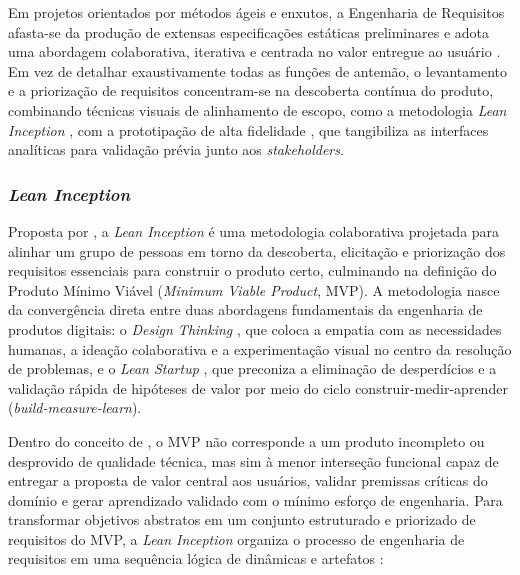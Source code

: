 Em projetos orientados por métodos ágeis e enxutos, a Engenharia de Requisitos afasta-se da produção de extensas especificações estáticas preliminares e adota uma abordagem colaborativa, iterativa e centrada no valor entregue ao usuário \cite{vazquez_engenharia_2016, cohn_user_2004}. Em vez de detalhar exaustivamente todas as funções de antemão, o levantamento e a priorização de requisitos concentram-se na descoberta contínua do produto, combinando técnicas visuais de alinhamento de escopo, como a metodologia \textit{Lean Inception} \cite{caroli_lean_2018}, com a prototipação de alta fidelidade \cite{pressman_engenharia_2021}, que tangibiliza as interfaces analíticas para validação prévia junto aos \textit{stakeholders}.

\subsubsection{\textit{Lean Inception}}
\label{subsubsec:lean-inception}

Proposta por , a \textit{Lean Inception} é uma metodologia colaborativa projetada para alinhar um grupo de pessoas em torno da descoberta, elicitação e priorização dos requisitos essenciais para construir o produto certo, culminando na definição do Produto Mínimo Viável (\textit{Minimum Viable Product}, MVP). A metodologia nasce da convergência direta entre duas abordagens fundamentais da engenharia de produtos digitais: o \textit{Design Thinking} \cite{brown_design_2010}, que coloca a empatia com as necessidades humanas, a ideação colaborativa e a experimentação visual no centro da resolução de problemas, e o \textit{Lean Startup} \cite{ries_lean_2011}, que preconiza a eliminação de desperdícios e a validação rápida de hipóteses de valor por meio do ciclo construir-medir-aprender (\textit{build-measure-learn}).

Dentro do conceito de , o MVP não corresponde a um produto incompleto ou desprovido de qualidade técnica, mas sim à menor interseção funcional capaz de entregar a proposta de valor central aos usuários, validar premissas críticas do domínio e gerar aprendizado validado com o mínimo esforço de engenharia. Para transformar objetivos abstratos em um conjunto estruturado e priorizado de requisitos do MVP, a \textit{Lean Inception} organiza o processo de engenharia de requisitos em uma sequência lógica de dinâmicas e artefatos \cite{caroli_lean_2018}:

